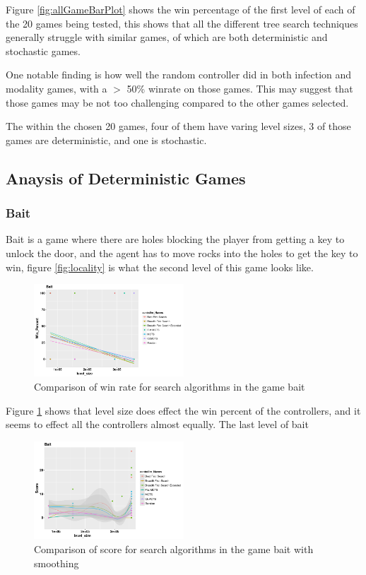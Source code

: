 \documentclass[journal]{IEEEtran}
\begin{document}
		Figure \ref{fig:allGameBarPlot} shows the win percentage of the first level of each of the 20 games being tested, this shows that all the different tree search techniques generally struggle with similar games, of which are both deterministic and stochastic games.


	One notable finding is how well the random controller did in both infection and modality games, with a $>$ 50\% winrate on those games. This may suggest that those games may be not too challenging compared to the other games selected.

	
	The within the chosen 20 games, four of them have varing level sizes, 3 of those games are deterministic, and one is stochastic.
	 \subsection{Anaysis of Deterministic Games}

		\subsubsection{Bait}
		Bait is a game where there are holes blocking the player from getting a key to unlock the door, and the agent has to move rocks into the holes to get the key to win, figure \ref{fig:locality} is what the second level  of this game looks like.
		\begin{figure}[h]
		    \centering
		    \includegraphics[width=0.5\textwidth]{Scatter/game_0_win}
		    \caption{ Comparison of win rate for search algorithms in the game bait }
		    \label{fig:game_0_win}
		\end{figure}
	Figure \ref{fig:game_0_win} shows that level size does effect the win percent of the controllers, and it seems to effect all the controllers almost equally. The last level of bait
		\begin{figure}[h]
		    \centering
		    \includegraphics[width=0.5\textwidth]{Scatter/game_0_score_smoothing_confidence}
		    \caption{ Comparison of score for search algorithms in the game bait with smoothing}
		    \label{fig:game_0_win_smoothing}
		\end{figure}
\end{document}

